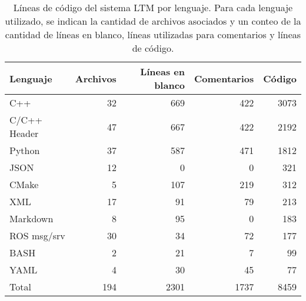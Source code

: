\begin{table}[!ht]
	\centering
	\begin{tabular}{|l|r|r|r|r|}
		\hline
		\rowcolor{gray!50}
		Lenguaje & Archivos & Líneas en blanco & Comentarios & Código \\ \hline
		C++                   &  32  &  669  &  422  &  3073 \\ \hline
		C/C++ Header          &  47  &  667  &  422  &  2192 \\ \hline
		Python                &  37  &  587  &  471  &  1812 \\ \hline
		JSON                  &  12  &    0  &    0  &   321 \\ \hline
		CMake                 &   5  &  107  &  219  &   312 \\ \hline
		XML                   &  17  &   91  &   79  &   213 \\ \hline
		Markdown              &   8  &   95  &    0  &   183 \\ \hline
		ROS msg/srv           &  30  &   34  &   72  &   177 \\ \hline
		BASH    &   2  &   21  &    7  &    99 \\ \hline
		YAML                  &   4  &   30  &   45  &    77 \\ \hline
		\rowcolor{gray!50}
		Total                 & 194  & 2301  & 1737  & 8459  \\ \hline	
	\end{tabular} 
	\caption[Líneas de código del sistema LTM por lenguaje.]
	{\small Líneas de código del sistema LTM por lenguaje. Para cada lenguaje utilizado, se indican la cantidad de archivos asociados y un conteo de la cantidad de líneas en blanco, líneas utilizadas para comentarios y líneas de código.}
	\label{table:lineas-codigo}
\end{table}


%
%
%

